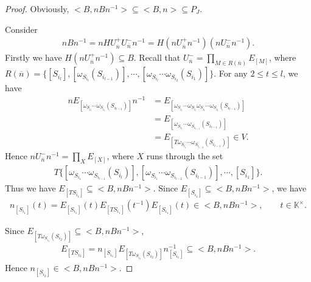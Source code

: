 \documentclass[12pt]{amsart}
\begin{document}
\begin{proof}
    Obviously, $<B,nBn^{-1}> \subseteq  <B,n> \subseteq  P_J$.
    
    Consider 
    \begin{align*}
        nBn^{-1} = nHU_{\overline{n}}^+ U_{\overline{n}}^- n^{-1} = H(nU_{\overline{n}}^+ n^{-1})(nU_{\overline{n}}^- n^{-1}).
    \end{align*}
    Firstly we have $ H(nU_{\overline{n}}^+ n^{-1})\subseteq  B$.
    Recall that $ U_{\overline{n}}^- = \prod\limits_{M\in R(\overline{n})} E_{[M]} $, 
    where $R(\overline{n}) = \{ [S_{i_l}], [\omega_{S_{i_l}}(S_{i_{l-1}})], \cdots,[\omega_{S_{i_l}} \cdots \omega_{S_{i_2}}(S_{i_1})]   \}$.
    For any $2\leq t \leq l$, we have
    \begin{align*}
        nE_{[\omega_{S_{i_l}} \cdots \omega_{S_{i_t}}(S_{i_{t-1}})]} n^{-1} &=  E_{[\omega_{S_{i_1}} \cdots \omega_{S_{i_l}} \omega_{S_{i_l}} \cdots \omega_{S_{i_t}}(S_{i_{t-1}})   ]} \\
          &= E_{[\omega_{S_{i_1}} \cdots \omega_{S_{i_{t-1}}}(S_{i_{t-1}})]} \\
          &= E_{[T\omega_{S_{i_1}} \cdots \omega_{S_{i_{t-2}}}(S_{i_{t-1}})]} \in V.
    \end{align*}
    Hence $nU_{\overline{n}}^- n^{-1} = \prod\limits_{X} E_{[X]} $, where $X$ runs through the set 
    \begin{align*}
        T \{ [\omega_{S_{i_1}} \cdots \omega_{S_{i_{l-1}}}(S_{i_{l}})], [\omega_{S_{i_1}} \cdots \omega_{S_{i_{l-2}}}(S_{i_{l-1}})] ,\cdots, [S_{i_1}] \}.
    \end{align*}
    Thus we have $E_{[TS_{i_1}]} \subseteq  <B,nBn^{-1}>$.
    Since $E_{[S_{i_1}]} \subseteq  <B,nBn^{-1}>$, we have
    \begin{align*}
        n_{[S_{i_1}]}(t) = E_{[S_{i_1}]}(t) E_{[TS_{i_1}]}(t^{-1}) E_{[S_{i_1}]}(t) \in <B,nBn^{-1}>, \qquad  t\in \mathbb{K}^{\times}.
    \end{align*}
    
    Since $E_{[T\omega_{S_{i_1}}(S_{i_2})]} \subseteq  <B,nBn^{-1}>$, 
    \begin{align*}
        E_{[TS_{i_2}]} = n_{[S_{i_1}]} E_{[T\omega_{S_{i_1}}(S_{i_2})]} n_{[S_{i_1}]}^{-1} \subseteq  <B,nBn^{-1}>.
    \end{align*}
    Hence $n_{[S_{i_2}]}\in <B,nBn^{-1}>$.


\end{proof}
\end{document}
